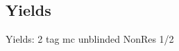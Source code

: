 
\subsection{Yields}

\begin{frame}{Yields: 2 tag mc unblinded NonRes 1/2}
\begin{center}
  \begin{tabular}{l| >{\centering\let\newline\\\arraybackslash\hspace{0pt}}m{1.4cm}| >{\centering\let\newline\\\arraybackslash\hspace{0pt}}m{1.4cm}| >{\centering\let\newline\\\arraybackslash\hspace{0pt}}m{1.4cm}| >{\centering\let\newline\\\arraybackslash\hspace{0pt}}m{1.4cm}| >{\centering\let\newline\\\arraybackslash\hspace{0pt}}m{1.4cm}| >{\centering\let\newline\\\arraybackslash\hspace{0pt}}m{1.4cm}| >{\centering\let\newline\\\arraybackslash\hspace{0pt}}m{1.4cm}| >{\centering\let\newline\\\arraybackslash\hspace{0pt}}m{1.4cm}| >{\centering\let\newline\\\arraybackslash\hspace{0pt}}m{1.4cm}| >{\centering\let\newline\\\arraybackslash\hspace{0pt}}m{1.4cm}| >{\centering\let\newline\\\arraybackslash\hspace{0pt}}m{1.4cm}| >{\centering\let\newline\\\arraybackslash\hspace{0pt}}m{1.4cm}}

\end{tabular}
\end{center}
\end{frame}
